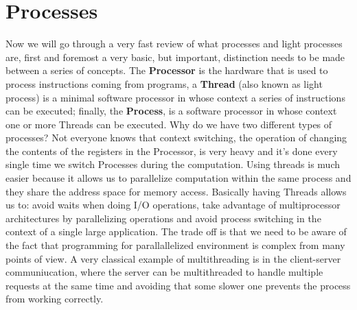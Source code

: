 \chapter{Processes}
Now we will go through a very fast review of what processes and light processes are, first and foremost a very basic, but important, distinction needs to be made between a series of concepts.
The \textbf{Processor} is the hardware that is used to process instructions coming from programs, a \textbf{Thread} (also known as light process) is a minimal software processor in whose context a series of instructions can be executed; finally, the \textbf{Process}, is a software processor in whose context one or more Threads can be executed. \n
Why do we have two different types of processes? Not everyone knows that context switching, the operation of changing the contents of the registers in the Processor, is very heavy and it's done every single time we switch Processes during the computation. Using threads is much easier because it allows us to parallelize computation within the same process and they share the address space for memory access. \n
Basically having Threads allows us to: avoid waits when doing I/O operations, take advantage of multiprocessor architectures by parallelizing operations and avoid process switching in the context of a single large application. \n
The trade off is that we need to be aware of the fact that programming for parallallelized environment is complex from many points of view. A very classical example of multithreading is in the client-server communiucation, where the server can be multithreaded to handle multiple requests at the same time and avoiding that some slower one prevents the process from working correctly. \n